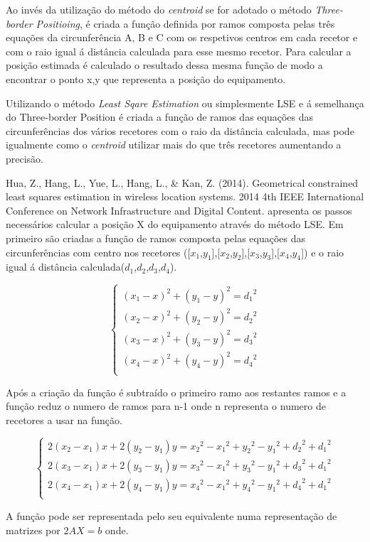 Ao invés da utilização do método do \textit{centroid} se for adotado o método \textit{Three-border Positioing}, é criada a função definida por ramos composta pelas três equações da circunferência A, B e C com os respetivos centros em cada recetor e com o raio igual á distância calculada para esse mesmo recetor. Para calcular a posição estimada é calculado o resultado dessa mesma função de modo a encontrar o ponto x,y que representa a posição do equipamento.
\par 
Utilizando o método \textit{Least Sqare Estimation} ou simplesmente LSE e á semelhança do Three-border Position\cite{Zhu2014} é criada a função de ramos das equações das circunferências dos vários recetores com o raio da distância calculada, mas pode igualmente como o \textit{centroid} utilizar mais do que três recetores aumentando a precisão. \par Hua, Z., Hang, L., Yue, L., Hang, L., \& Kan, Z. (2014). Geometrical constrained least squares estimation in wireless location systems. 2014 4th IEEE International Conference on Network Infrastructure and Digital Content. apresenta os passos necessários calcular a posição X do equipamento através do método LSE. Em primeiro são criadas a função de ramos composta pelas equações das circunferências com centro nos recetores ([$x_{1}$,$y_{1}$],[$x_{2}$,$y_{2}$],[$x_{3}$,$y_{3}$],[$x_{4}$,$y_{4}$]) e o raio igual á distância calculada($d_{1}$,$d_{2}$,$d_{3}$,$d_{4}$).
\begin{center}
\[
\begin{cases}
(x_{1} -x)^2 + (y_{1}-y)^2 = {d_{1}}^2\\
(x_{2} -x)^2 + (y_{2}-y)^2 = {d_{2}}^2\\
(x_{3} -x)^2 + (y_{3}-y)^2 = {d_{3}}^2\\
(x_{4} -x)^2 + (y_{4}-y)^2 = {d_{4}}^2\\
\end{cases}
\]
\end{center}

\par Após a criação da função é subtraído o primeiro ramo aos restantes ramos e a função reduz o numero de ramos para n-1 onde n representa o numero de recetores a usar na função.
\begin{center}

\[
\begin{cases}
2(x_{2}-x_{1})x+2(y_{2}-y_{1})y={x_{2}}^2-{x_{1}}^2+{y_{2}}^2-{y_{1}}^2+{d_{2}}^2+{ d_{1}}^2\\
2(x_{3}-x_{1})x+2(y_{3}-y_{1})y={x_{3}}^2-{x_{1}}^2+{y_{3}}^2-{y_{1}}^2+{d_{3}}^2+{ d_{1}}^2\\
2(x_{4}-x_{1})x+2(y_{4}-y_{1})y={x_{4}}^2-{x_{1}}^2+{y_{4}}^2-{y_{1}}^2+{d_{4}}^2+{ d_{1}}^2\\
\end{cases}
\]
\end{center}
\par A função pode ser representada pelo seu equivalente numa representação de matrizes por $2AX = b$ onde.

